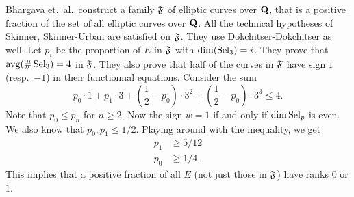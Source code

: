 Bhargava et.~al.~construct a family $\mathfrak{F}$ of elliptic curves over $\mathbf{Q}$, 
that is a positive fraction of the set of all elliptic curves over $\mathbf{Q}$. All 
the technical hypotheses of Skinner, Skinner-Urban are satisfied on $\mathfrak{F}$. They 
use Dokchitser-Dokchitser as well. Let $p_i$ be the proportion of $E$ in $\mathfrak{F}$ 
with $\dim(\operatorname{Sel}_3)=i$. They prove that $\operatorname{avg}(\#\operatorname{Sel}_3)=4$ in $\mathfrak{F}$. 
They also prove that half of the curves in $\mathfrak{F}$ have sign $1$ (resp.~$-1$) in 
their functionnal equations. Consider the sum 
\[
  p_0\cdot 1 + p_1\cdot 3 + \left(\frac 1 2-p_0\right)\cdot 3^2 + \left(\frac 1 2-p_0\right)\cdot 3^3 \leqslant 4.
\]
Note that $p_0\leqslant p_n$ for $n\geqslant 2$. Now the sign $w=1$ if 
and only if $\dim\operatorname{Sel}_p$ is even. We also know that $p_0,p_1\leqslant 1/2$. 
Playing around with the inequality, we get 
\begin{align*}
  p_1 &\geqslant 5/12 \\
  p_0 &\geqslant 1/4 .
\end{align*}
This implies that a positive fraction of all $E$ (not just those in $\mathfrak{F}$) have 
ranks $0$ or $1$. 








